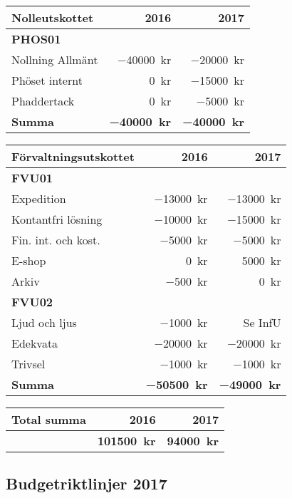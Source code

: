 \documentclass[../_main/handlingar.tex]{subfiles}
\begin{document}
\begin{tabularx}{10cm}{X r r}
    \textbf{\large Nolleutskottet} & \textbf{2016} & \textbf{2017} \\
    \hline
    \textbf{PHOS01} \\
    Nollning Allmänt & \SI{-40000}{kr} & \SI{-20000}{kr} \\
    Phöset internt & \SI{0}{kr} & \SI{-15000}{kr} \\
    Phaddertack & \SI{0}{kr} & \SI{-5000}{kr} \\
    \hline
    \textbf{Summa} & \textbf{\SI{-40000}{kr}} & \textbf{\SI{-40000}{kr}} \\
\end{tabularx}

\begin{tabularx}{9cm}{X r r}
    \textbf{\large Förvaltningsutskottet} & \textbf{2016} & \textbf{2017} \\
    \hline
    \textbf{FVU01} \\
    Expedition & \SI{-13000}{kr} & \SI{-13000}{kr} \\
    Kontantfri lösning & \SI{-10000}{kr} & \SI{-15000}{kr} \\
    Fin. int. och kost. & \SI{-5000}{kr} & \SI{-5000}{kr} \\
    E-shop & \SI{0}{kr} & \SI{5000}{kr} \\
    Arkiv & \SI{-500}{kr} & \SI{0}{kr} \\
    \textbf{FVU02} \\
    Ljud och ljus & \SI{-1000}{kr} & Se InfU \\
    Edekvata & \SI{-20000}{kr} & \SI{-20000}{kr} \\
    Trivsel & \SI{-1000}{kr} & \SI{-1000}{kr} \\
    \hline
    \textbf{Summa} & \textbf{\SI{-50500}{kr}} & \textbf{\SI{-49000}{kr}} \\
\end{tabularx}

\begin{tabularx}{9cm}{X r r}
    \textbf{\large Total summa} & \textbf{2016} & \textbf{2017} \\
    \hline
     & \textbf{\SI{101500}{kr}} & \textbf{\SI{94000}{kr}} \\
\end{tabularx}


\newpage
\subsection*{Budgetriktlinjer 2017}
\end{document}
